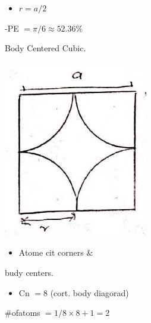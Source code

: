 \documentclass[10pt]{article}
\begin{document}
\begin{itemize}
  \item $r=a / 2$
\end{itemize}

-PE $=\pi / 6 \approx 52.36 \%$

Body Centered Cubic.

\begin{center}
\includegraphics[max width=\textwidth]{2024_06_16_30d750483617f1939202g-07(2)}
\end{center}

\begin{itemize}
  \item Atome cit corners \&
\end{itemize}

budy centers.

\begin{itemize}
  \item Cn $=8$ (cort. body diagorad)
\end{itemize}

\#ofatoms $=1 / 8 \times 8+1=2$
\end{document}
